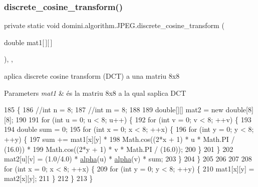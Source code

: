 \subsubsection{\texorpdfstring{discrete\+\_\+cosine\+\_\+transform()}{discrete\_cosine\_transform()}}
{\footnotesize\ttfamily private static void domini.\+algorithm.\+J\+P\+E\+G.\+discrete\+\_\+cosine\+\_\+transform (\begin{DoxyParamCaption}\item[{double}]{mat1\mbox{[}$\,$\mbox{]}\mbox{[}$\,$\mbox{]} }\end{DoxyParamCaption})\hspace{0.3cm}{\ttfamily [inline]}, {\ttfamily [static]}, {\ttfamily [private]}}



aplica discrete cosine transform (D\+CT) a una matriu 8x8 


\begin{DoxyParams}{Parameters}
{\em mat1} & és la matriu 8x8 a la qual s\textquotesingle{}aplica D\+CT \\
\hline
\end{DoxyParams}

\begin{DoxyCode}
185                                                                    \{
186         \textcolor{comment}{//int n = 8;}
187         \textcolor{comment}{//int m = 8;}
188         
189         \textcolor{keywordtype}{double}[][] mat2 = \textcolor{keyword}{new} \textcolor{keywordtype}{double}[8][8];
190 
191         \textcolor{keywordflow}{for} (\textcolor{keywordtype}{int} u = 0; u < 8; u++) \{
192             \textcolor{keywordflow}{for} (\textcolor{keywordtype}{int} v = 0; v < 8; ++v) \{
193 
194                 \textcolor{keywordtype}{double} sum = 0;
195                 \textcolor{keywordflow}{for} (\textcolor{keywordtype}{int} x = 0; x < 8; ++x) \{ 
196                     \textcolor{keywordflow}{for} (\textcolor{keywordtype}{int} y = 0; y < 8; ++y)  \{ 
197                         sum += mat1[x][y] *  
198                                Math.cos((2*x + 1) * u * Math.PI / (16.0)) *  
199                                Math.cos((2*y + 1) * v * Math.PI / (16.0)); 
200                     \} 
201                 \}
202                 mat2[u][v] = (1.0/4.0) * \hyperlink{classdomini_1_1algorithm_1_1JPEG_a058b0ee7eb44bbaec4078b5fc32c5107}{alpha}(u) * \hyperlink{classdomini_1_1algorithm_1_1JPEG_a058b0ee7eb44bbaec4078b5fc32c5107}{alpha}(v) * sum;
203             \}
204         \}
205 
206         
207 
208         \textcolor{keywordflow}{for} (\textcolor{keywordtype}{int} x = 0; x < 8; ++x) \{
209             \textcolor{keywordflow}{for} (\textcolor{keywordtype}{int} y = 0; y < 8; ++y) \{ 
210                 mat1[x][y] = mat2[x][y];
211             \}
212         \}
213     \}
\end{DoxyCode}
\mbox{\label{classdomini_1_1algorithm_1_1JPEG_af86bdbb6b6f5671abff6bc6bd5f6349d}} 
